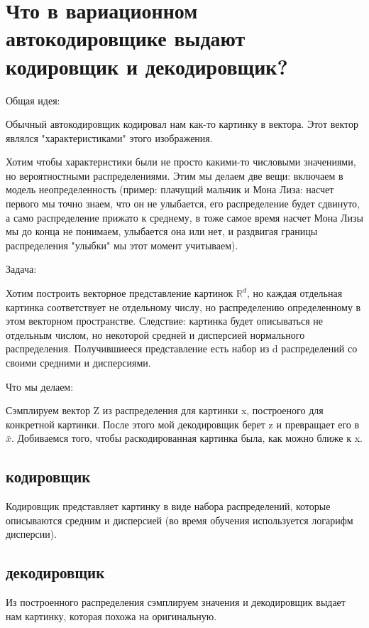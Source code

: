 \section{Что в вариационном автокодировщике выдают кодировщик и декодировщик?} 
	
	Общая идея: 
	
	Обычный автокодировщик кодировал нам как-то картинку в вектора. Этот вектор являлся "характеристиками" этого изображения. 
	
	Хотим чтобы характеристики были не просто какими-то числовыми значениями, но вероятностными распределениями. Этим мы делаем две вещи: включаем в модель неопределенность (пример: плачущий мальчик и Мона Лиза: насчет первого мы точно знаем, что он не улыбается, его распределение будет сдвинуто, а само распределение прижато к среднему, в тоже самое время насчет Мона Лизы мы до конца не понимаем, улыбается она или нет, и раздвигая границы распределения "улыбки" мы этот момент учитываем). 
	
	Задача:
	
	Хотим построить векторное представление картинок $\mathbb{R}^{d}$, но каждая отдельная картинка соответствует не отдельному числу, но распределению определенному в этом векторном пространстве. Следствие: картинка будет описываться не отдельным числом, но некоторой средней и дисперсией нормального распределения. Получившиееся представление есть набор из d распределений со своими средними и дисперсиями. 
	
	Что мы делаем: 
	
	Сэмплируем вектор Z из распределения для картинки x, построеного для конкретной картинки. После этого мой декодировщик берет z и превращает его в $\bar x$.  Добиваемся того, чтобы раскодированная картинка была, как можно ближе к x.
	
	
	\subsection{кодировщик}
	
	Кодировщик представляет картинку в виде набора распределений, которые описываются средним и дисперсией (во время обучения используется логарифм дисперсии). 

	
	\subsection{декодировщик}
	
	Из построенного распределения сэмплируем значения и декодировщик выдает нам картинку, которая похожа на оригинальную. 
